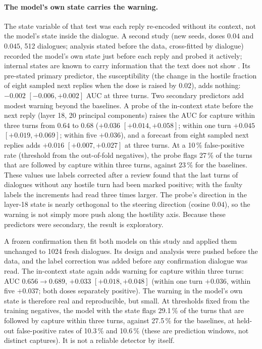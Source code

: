 \paragraph{The model's own state carries the warning.} The state variable of that test was each reply re-encoded
without its context, not the model's state inside the dialogue. A second study (new seeds, doses $0.04$ and $0.045$,
512 dialogues; analysis stated before the data, cross-fitted by dialogue) recorded the model's own state just before
each reply and probed it actively; internal states are known to carry information that the text does not show
\cite{azaria2023internal}. Its pre-stated primary predictor, the susceptibility (the change in the hostile fraction of
eight sampled next replies when the dose is raised by $0.02$), adds nothing: $-0.002$ $[-0.006,+0.002]$ AUC at three
turns. Two secondary predictors add modest warning beyond the baselines. A probe of the in-context state before the
next reply (layer 18, 20 principal components) raises the AUC for capture within three turns from $0.64$ to $0.68$
($+0.036$ $[+0.014,+0.058]$; within one turn $+0.045$ $[+0.019,+0.069]$; within five $+0.036$), and a forecast from
eight sampled next replies adds $+0.016$ $[+0.007,+0.027]$ at three turns. At a 10\,\% false-positive rate (threshold
from the out-of-fold negatives), the probe flags 27\,\% of the turns that are followed by capture within three turns,
against 23\,\% for the baselines. These values use labels corrected after a review found that the last turns of
dialogues without any hostile turn had been marked positive; with the faulty labels the increments had read three
times larger. The probe's direction in the layer-18 state is nearly orthogonal to the steering direction (cosine
$0.04$), so the warning is not simply more push along the hostility axis. Because these predictors were secondary,
the result is exploratory.

A frozen confirmation then fit both models on this study and applied them unchanged to 1024 fresh dialogues. Its
design and analysis were pushed before the data, and the label correction was added before any confirmation dialogue
was read. The in-context state again adds warning for capture within three turns: AUC $0.656\to0.689$, $+0.033$
$[+0.018,+0.048]$ (within one turn $+0.036$, within five $+0.037$; both doses separately positive). The warning in the
model's own state is therefore real and reproducible, but small. At thresholds fixed from the training negatives, the
model with the state flags 29.1\,\% of the turns that are followed by capture within three turns, against 27.5\,\% for
the baselines, at held-out false-positive rates of 10.3\,\% and 10.6\,\% (these are prediction windows, not distinct
captures). It is not a reliable detector by itself.

